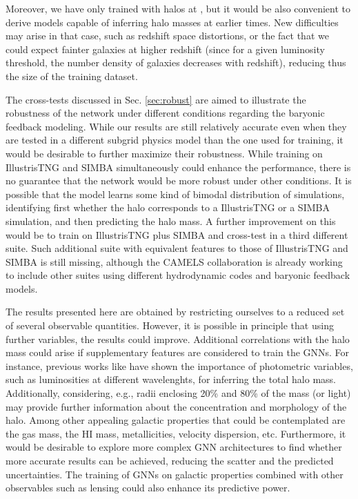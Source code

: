 \documentclass[twocolumn]{aastex631}
\begin{document}
Moreover, we have only trained with halos at , but it would be also convenient to derive models capable of inferring halo masses at earlier times. New difficulties may arise in that case, such as redshift space distortions, or the fact that we could expect fainter galaxies at higher redshift (since for a given luminosity threshold, the number density of galaxies decreases with redshift), reducing thus the size of the training dataset.

The cross-tests discussed in Sec. \ref{sec:robust} are aimed to illustrate the robustness of the network under different conditions regarding the baryonic feedback modeling. While our results are still relatively accurate even when they are tested in a different subgrid physics model than the one used for training, it would be desirable to further maximize their robustness. While training on IllustrisTNG and SIMBA simultaneously could enhance the performance, there is no guarantee that the network would be more robust under other conditions. It is possible that the model learns some kind of bimodal distribution of simulations, identifying first whether the halo corresponds to a IllustrisTNG or a SIMBA simulation, and then predicting the halo mass. A further improvement on this would be to train on IllustrisTNG plus SIMBA and cross-test in a third different suite. Such additional suite with equivalent features to those of IllustrisTNG and SIMBA is still missing, although the CAMELS collaboration is already working to include other suites using different hydrodynamic codes and baryonic feedback models.

The results presented here are obtained by restricting ourselves to a reduced set of several observable quantities. However, it is possible in principle that using further variables, the results could improve. Additional correlations with the halo mass could arise if supplementary features are considered to train the GNNs. For instance, previous works like \cite{2021arXiv211101185V} have shown the importance of photometric variables, such as luminosities at different wavelenghts, for inferring the total halo mass. Additionally, considering, e.g., radii enclosing 20\% and 80\% of the mass (or light) may provide further information about the concentration and morphology of the halo. Among other appealing galactic properties that could be contemplated are the gas mass, the HI mass, metallicities, velocity dispersion, etc. Furthermore, it would be desirable to explore more complex GNN architectures to find whether more accurate results can be achieved, reducing the scatter and the predicted uncertainties. The training of GNNs on galactic properties combined with other observables such as lensing could also enhance its predictive power.
\end{document}
